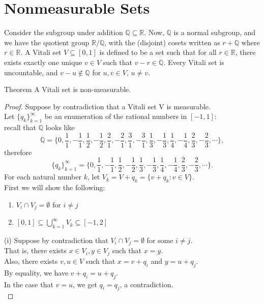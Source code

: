 \section{Nonmeasurable Sets}
\begin{flushleft}
	Consider the subgroup under addition $\mathbb{Q}\subseteq\mathbb{R}$.
	Now, $\mathbb{Q}$ is a normal subgroup, and we have the quotient group $\mathbb{R}/\mathbb{Q}$, with the (disjoint) cosets written as $r+\mathbb{Q}$ where $r\in\mathbb{R}$.
	A Vitali set $V\subseteq[0,1]$ is defined to be a set such that for all $r\in\mathbb{R}$, there exists exactly one unique $v\in V$ such that $v-r\in\mathbb{Q}$.
	Every Vitali set is uncountable, and $v-u\notin\mathbb{Q}$ for $u,v\in V$, $u\neq v$.
	\begin{namedthm*}{Theorem}
		A Vitali set is non-measurable.
	\end{namedthm*}
	\begin{proof}
		Suppose by contradiction that a Vitali set V is measurable.\\
		Let $\{q_k\}_{k=1}^\infty$ be an enumeration of the rational numbers in $[-1,1]$:\\
		recall that $\mathbb{Q}$ looks like
		\[
			\mathbb{Q} = \{0,\frac{1}{1},-\frac{1}{1},\frac{1}{2},-\frac{1}{2},\frac{2}{1},-\frac{2}{1}, \frac{3}{1}, -\frac{3}{1},\frac{1}{3},-\frac{1}{3},\frac{1}{4},-\frac{1}{4},\frac{2}{3},-\frac{2}{3},\cdots \},
		\]
		therefore
		\[
			\{q_k\}_{k=1}^\infty= \{0,\frac{1}{1},-\frac{1}{1},\frac{1}{2},-\frac{1}{2},\frac{1}{3},-\frac{1}{3},\frac{1}{4},-\frac{1}{4},\frac{2}{3},-\frac{2}{3},\cdots \}.
		\]
		For each natural number $k$, let $V_k=V+q_k=\{v+q_k:v\in V\}$.\\
		First we will show the following:
		\begin{enumerate}[label=(\roman*),align=left]
			\item $V_i\cap V_j=\emptyset$ for $i\neq j$
			\item $[0,1]\subseteq\bigcup_{k=1}^\infty V_k \subseteq [-1,2]$
		\end{enumerate}
		(i) Suppose by contradiction that $V_i\cap V_j=\emptyset$ for some $i\neq j$.\\
		That is, there exists $x\in V_i,y\in V_j$ such that $x=y$.\\
		Also, there exists $v,u\in V$ such that $x=v+q_i$ and $y=u+q_j$.\\
		By equality, we have $v+q_i=u+q_j$.\\
		In the case that $v=u$, we get $q_i=q_j$, a contradiction.\\

\end{proof}
\end{flushleft}
